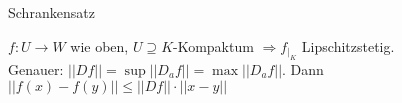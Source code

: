 \documentclass[class=article, crop=false]{standalone}
\begin{document}
\begin{zettel}{Schrankensatz}
\begin{flashcard}
	\begin{theorem}[Schrankensatz]
		$f: U \to W$ wie oben,  $U\supseteq K$-Kompaktum $\Rightarrow f _{\big | _{K} } $ Lipschitzstetig. \\
		Genauer: $|| Df || = \sup || D_af || = \max || D_af || .$ Dann $|| f(x) - f(y) || \leq || Df || \cdot || x - y ||  $
	\end{theorem}
\end{flashcard}
\end{zettel}
\end{document}
